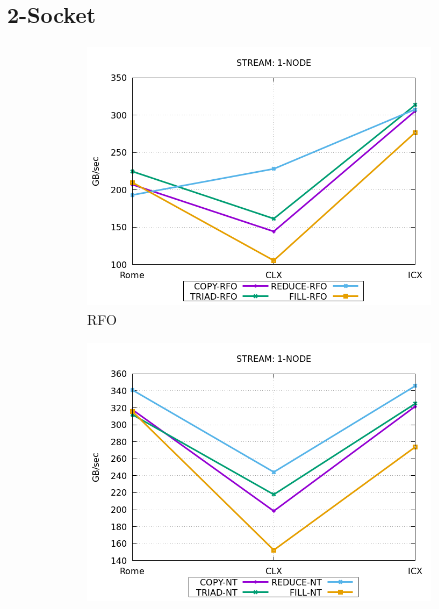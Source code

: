 \documentclass{article}
\begin{document}
\subsection{2-Socket} \label{2-socket}
\begin{figure}[!ht]
    \centering
    \begin{subfigure}[!ht]{0.3\textwidth}
         \centering
         \includegraphics[width=\textwidth]{../data/rome-clx-icx/mem_bw_node/mb_node_rfo}
         \caption{RFO}
         \label{figure:mem_bw_node_rfo}
    \end{subfigure}
    \begin{subfigure}[!ht]{0.3\textwidth}
         \centering
         \includegraphics[width=\textwidth]{../data/rome-clx-icx/mem_bw_node/mb_node_nt}

\end{subfigure}
\end{figure}
\end{document}
